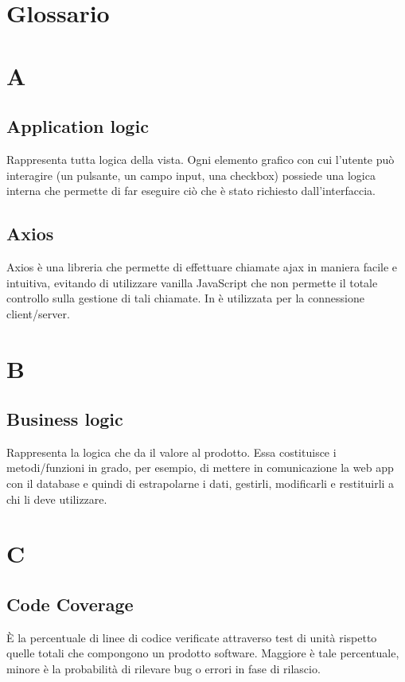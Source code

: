 \appendix
\section{Glossario}
\section*{A}
\subsection*{Application logic}
Rappresenta tutta logica della vista. Ogni elemento grafico con cui l'utente può interagire (un pulsante, un campo input, una checkbox) possiede una logica interna che permette di far eseguire ciò che è stato richiesto dall'interfaccia. 

\subsection*{Axios}
Axios è una libreria che permette di effettuare chiamate ajax in maniera facile e intuitiva, evitando di utilizzare vanilla JavaScript che non permette il totale controllo sulla gestione di tali chiamate. In \NomeProgetto{} è utilizzata per la connessione client/server.

\section*{B}
\subsection*{Business logic}
Rappresenta la logica che da il valore al prodotto. Essa costituisce i metodi/funzioni in grado, per esempio, di mettere in comunicazione la web app con il database e quindi di estrapolarne i dati, gestirli, modificarli e restituirli a chi li deve utilizzare.

\section*{C}
\subsection*{Code Coverage}
È la percentuale di linee di codice verificate attraverso test di unità rispetto quelle totali che compongono un prodotto software. Maggiore è tale percentuale, minore è la probabilità di rilevare bug o errori in fase di rilascio.

